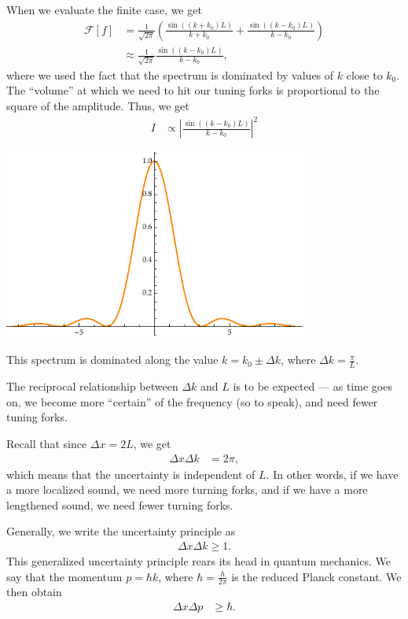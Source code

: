 \documentclass[10pt]{mypackage}
\begin{document}
\begin{example}
  When we evaluate the finite case, we get
  \begin{align*}
    \mathcal{F}\left[f\right] &= \frac{1}{\sqrt{2\pi}} \left(\frac{\sin\left(\left(k + k_0\right)L\right)}{k + k_0} + \frac{\sin\left(\left(k-k_0\right)L\right)}{k-k_0}\right)\\
                              &\approx \frac{1}{\sqrt{2\pi}} \frac{\sin\left(\left(k-k_0\right)L\right)}{k-k_0},
  \end{align*}
  where we used the fact that the spectrum is dominated by values of $k$ close to $k_0$. The ``volume'' at which we need to hit our tuning forks is proportional to the square of the amplitude. Thus, we get
  \begin{align*}
    I &\propto \left\vert \frac{\sin\left(\left(k-k_0\right)L\right)}{k-k_0} \right\vert^2
  \end{align*}
  \begin{center}
    \includegraphics[width=10cm]{images/spectrum_wave_packet.pdf}
  \end{center}
  This spectrum is dominated along the value $k = k_0 \pm \Delta k$, where $\Delta k = \frac{\pi}{L}$.\newline

  The reciprocal relationship between $\Delta k$ and $L$ is to be expected --- as time goes on, we become more ``certain'' of the frequency (so to speak), and need fewer tuning forks.\newline

  Recall that since $\Delta x = 2L$, we get
  \begin{align*}
    \Delta x  \Delta k &= 2\pi,
  \end{align*}
  which means that the uncertainty is independent of $L$. In other words, if we have a more localized sound, we need more turning forks, and if we have a more lengthened sound, we need fewer turning forks.\newline

  Generally, we write the uncertainty principle as
  \begin{align*}
    \Delta x \Delta k \geq 1.
  \end{align*}
  This generalized uncertainty principle rears its head in quantum mechanics. We say that the momentum $p= \hbar k$, where $\hbar = \frac{h}{2\pi}$ is the reduced Planck constant. We then obtain
  \begin{align*}
    \Delta x \Delta p &\geq \hbar.
  \end{align*}
\end{example}
\end{document}
